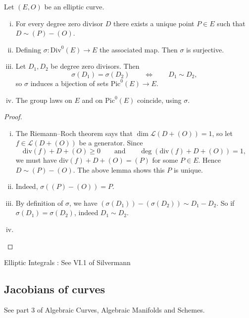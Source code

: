 \begin{proposition}
    Let $(E, O)$ be an elliptic curve.
    \begin{enumerate}[(i)]
        \item For every degree zero divisor $D$ there exists a unique point $P \in E$ such that $D \sim{} (P) - (O)$.
        
        \item Defining $\sigma : \text{Div}^0(E) \to E$ the associated map. Then $\sigma$ is surjective.
        
        \item Let $D_1, D_2$ be degree zero divisors. Then
        \[ \sigma(D_1) = \sigma(D_2) \qquad \iff \qquad D_1 \sim{} D_2 , \]
        so $\sigma$ induces a bijection of sets $\text{Pic}^0(E) \to E$.
        
        \item The group laws on $E$ and on $\text{Pic}^0(E)$ coincide, using $\sigma$.
    \end{enumerate}
\end{proposition}
\begin{proof}
    \begin{enumerate}[(i)]
        \item The Riemann--Roch theorem says that $\dim \mathcal{L}(D + (O)) = 1$, so let $f \in \mathcal{L}(D + (O))$ be a generator. Since
        \[ \text{div}(f) + D + (O) \ge 0 \qquad \text{and} \qquad \deg(\text{div}(f) + D + (O)) = 1, \]
        we must have $\text{div}(f) + D + (O) = (P)$ for some $P \in E$. Hence $D \sim{} (P) - (O)$. The above lemma shows this $P$ is unique.
        
        \item Indeed, $\sigma((P) - (O)) = P$.
        
        \item By definition of $\sigma$, we have $(\sigma(D_1)) - (\sigma(D_2)) \sim{} D_1 - D_2$. So if $\sigma(D_1) = \sigma(D_2)$, indeed $D_1 \sim{} D_2$.
        
        \item {}
    \end{enumerate}
\end{proof}

Elliptic Integrals : See VI.1 of Silvermann

\subsection{Jacobians of curves}

See part 3 of Algebraic Curves, Algebraic Manifolds and Schemes.